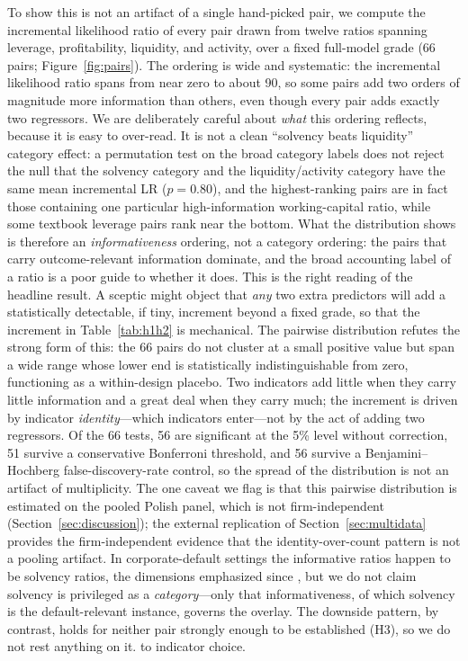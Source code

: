 \documentclass[pdflatex,sn-mathphys-ay]{sn-jnl}
\begin{document}
To show this is not an artifact of a single hand-picked pair, we compute the incremental likelihood
ratio of every pair drawn from twelve ratios spanning leverage, profitability, liquidity, and
activity, over a fixed full-model grade (66 pairs; Figure~\ref{fig:pairs}). The ordering is wide and
systematic: the incremental likelihood ratio spans from near zero to about 90, so some pairs add two
orders of magnitude more information than others, even though every pair adds exactly two regressors.
We are deliberately careful about \emph{what} this ordering reflects, because it is easy to over-read.
It is not a clean ``solvency beats liquidity'' category effect: a permutation test on the broad
category labels does not reject the null that the solvency category and the liquidity/activity category
have the same mean incremental LR ($p=0.80$), and the highest-ranking pairs are in fact those containing
one particular high-information working-capital ratio, while some textbook leverage pairs rank near the
bottom. What the distribution shows is therefore an \emph{informativeness} ordering, not a category
ordering: the pairs that carry outcome-relevant information dominate, and the broad accounting label of
a ratio is a poor guide to whether it does. This is the right reading of the headline result. A sceptic
might object that \emph{any} two extra predictors will add a statistically detectable, if tiny,
increment beyond a fixed grade, so that the increment in Table~\ref{tab:h1h2} is mechanical. The
pairwise distribution refutes the strong form of this: the 66 pairs do not cluster at a small positive
value but span a wide range whose lower end is statistically indistinguishable from zero, functioning as
a within-design placebo. Two indicators add little when they carry little information and a great deal
when they carry much; the increment is driven by indicator \emph{identity}---which indicators enter---not
by the act of adding two regressors. Of the 66 tests, 56 are significant at the 5\% level without
correction, 51 survive a conservative Bonferroni threshold, and 56 survive a Benjamini--Hochberg
false-discovery-rate control, so the spread of the distribution is not an artifact of multiplicity. The
one caveat we flag is that this pairwise distribution is estimated on the pooled Polish panel, which is
not firm-independent (Section~\ref{sec:discussion}); the external replication of
Section~\ref{sec:multidata} provides the firm-independent evidence that the identity-over-count pattern
is not a pooling artifact. In corporate-default settings the informative ratios happen to be solvency
ratios, the dimensions emphasized since \citet{altman1968}, but we do not claim solvency is privileged
as a \emph{category}---only that informativeness, of which solvency is the default-relevant instance,
governs the overlay. The downside pattern, by contrast, holds for neither pair strongly enough to be
established (H3), so we do not rest anything on it.
to indicator choice.
\end{document}
